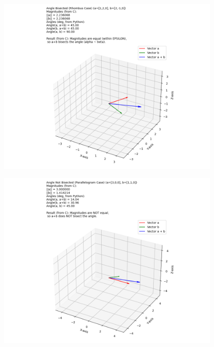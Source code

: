 \documentclass[journal]{IEEEtran}
\begin{document}
	
	
		\begin{figure}[H]
		\centering
		\includegraphics[width = 0.6\columnwidth]{Figure_1.png}
		\caption*{}
		\label{fig1}
	\end{figure}
	\begin{figure}[H]
		\centering
		\includegraphics[width = 0.6\columnwidth]{Figure_2.png}
		\caption*{}
		\label{fig2}
	\end{figure}
	
	
\end{document}
